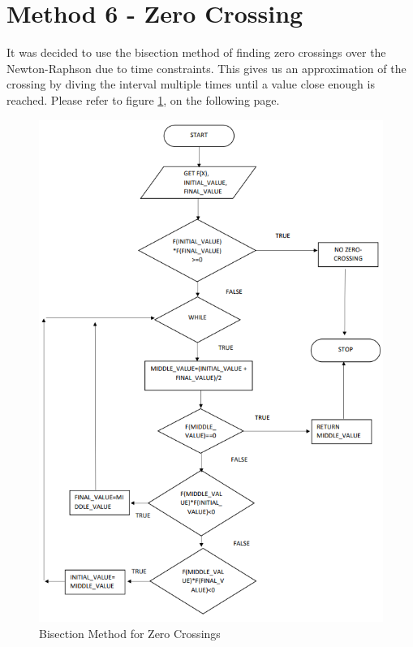 \documentclass[a4paper, oneside, 11pt]{report}
\begin{document}
\section{Method 6 - Zero Crossing}\label{zero-crossing-sec}
It was decided to use the bisection method of finding zero crossings over the Newton-Raphson due to time constraints. This gives us an approximation of the crossing by diving the interval multiple times until a value close enough is reached. Please refer to figure \ref{fig:bisection}, on the following page.

\begin{figure}[H]
    \centering
    \includegraphics[width=16cm]{BisectionMethod.png}
    \caption{Bisection Method for Zero Crossings}
    \label{fig:bisection}
\end{figure}
\FloatBarrier
\end{document}
